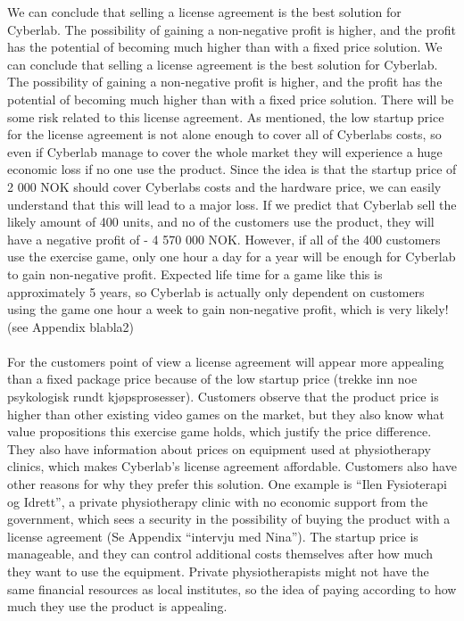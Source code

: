 We can conclude that selling a license agreement is the best solution for Cyberlab. The possibility of gaining a non-negative profit is higher, and the profit has the potential of becoming much higher than with a fixed price solution. We can conclude that selling a license agreement is the best solution for Cyberlab. The possibility of gaining a non-negative profit is higher, and the profit has the potential of becoming much higher than with a fixed price solution. There will be some risk related to this license agreement. As mentioned, the low startup price for the license agreement is not alone enough to cover all of Cyberlabs costs, so even if Cyberlab manage to cover the whole market they will experience a huge economic loss if no one use the product. Since the idea is that the startup price of 2 000 NOK should cover Cyberlabs costs and the hardware price, we can easily understand that this will lead to a major loss. If we predict that Cyberlab sell the likely amount of 400 units, and no of the customers use the product, they will have a negative profit of - 4 570 000 NOK. However, if all of the 400 customers use the exercise game, only one hour a day for a year will be enough for Cyberlab to gain non-negative profit. Expected life time for a game like this is approximately 5 years, so Cyberlab is actually only dependent on customers using the game one hour a week to gain non-negative profit, which is very likely! (see Appendix blabla2) \\ \\   
For the customers point of view a license agreement will appear more appealing than a fixed package price because of the low startup price (trekke inn noe psykologisk rundt kj{ø}psprosesser). Customers observe that the product price is higher than other existing video games on the market, but they also know what value propositions this exercise game holds, which justify the price difference. They also have information about prices on equipment used at physiotherapy clinics, which makes Cyberlab’s license agreement affordable. Customers also have other reasons for why they prefer this solution. One example is “Ilen Fysioterapi og Idrett”, a private physiotherapy clinic with no economic support from the government, which sees a security in the possibility of buying the product with a license agreement (Se Appendix “intervju med Nina”). The startup price is manageable, and they can control additional costs themselves after how much they want to use the equipment. Private physiotherapists might not have the same financial resources as local institutes, so the idea of paying according to how much they use the product is appealing. 


